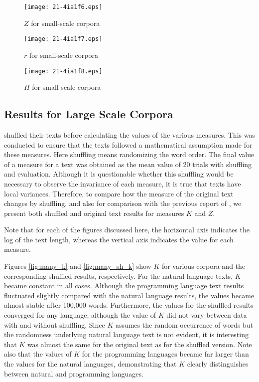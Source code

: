 \documentclass[english]{jnlp_1.4_rep}
\begin{document}
\begin{figure}[t]
\begin{minipage}{0.49\hsize}
\begin{center}
\texttt{[image: 21-4ia1f6.eps]}
\end{center}
\caption{$Z$ for small-scale corpora}
\label{fig:small_z}
\end{minipage}
\hfill
\begin{minipage}{0.49\hsize}
\begin{center}
\texttt{[image: 21-4ia1f7.eps]}
\end{center}
\caption{$r$ for small-scale corpora}
\label{fig:small_r}
\end{minipage}
\end{figure}
\begin{figure}[t]
\begin{center}
\texttt{[image: 21-4ia1f8.eps]}
\end{center}
\caption{$H$ for small-scale corpora}
\label{fig:small_h}
\end{figure}


\subsection{Results for Large Scale Corpora} 
\label{result_normal}

\cite{BaayenTweedie} shuffled their texts before calculating the values of the various measures. 
This was conducted to ensure that the texts followed a mathematical assumption made for these measures. 
Here shuffling means randomizing the word order. The final value of a measure for a text was obtained as the mean value of 20 trials with shuffling and evaluation. 
Although it is questionable whether this shuffling would be necessary to observe the invariance of each measure, it is true that texts have local variances. Therefore, 
to compare how the measure of the original text changes by shuffling, 
and also for comparison with the previous report of \cite{BaayenTweedie}, we present both shuffled and original 
text results for measures $K$ and $Z$.

Note that for each of the figures discussed here, the horizontal axis indicates the log of the text length, whereas the vertical axis indicates the value for each measure.

Figures \ref{fig:many_k} and \ref{fig:many_sh_k} show $K$ for various corpora and the corresponding shuffled results, respectively. For the natural language texts, $K$ became constant in all cases. 
Although the programming language text results fluctuated slightly compared 
with the natural language results, the values became almost stable after 100,000 words. Furthermore, the values for the shuffled results converged for any language, although the value of $K$ did not vary between data with and without shuffling. 
Since $K$ assumes the random occurrence of words but the randomness 
underlying natural language text is not evident, it is interesting that $K$ 
was almost the same for the original text as for the shuffled version. 
Note also that the values of $K$ for the programming languages became far larger 
than the values for the natural languages, demonstrating that $K$ 
clearly distinguishes between natural and programming languages. 
\end{document}
